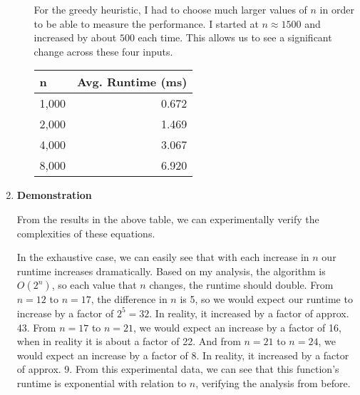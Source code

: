 \documentclass[12pt]{article}
\begin{document}
\begin{enumerate}
\begin{enumerate}
                    For the greedy heuristic, I had to choose much larger values of $n$
                    in order to be able to measure the performance. I started at $n \approx 1500$
                    and increased by about $500$ each time. This allows us to see a significant change
                    across these four inputs.
                    
                    \begin{center}
                        \begin{tabular}{ |l |r |}
                            \hline
                            \textbf{n} & \textbf{Avg. Runtime (ms)} \\
                            \hline
                            1,000      & 0.672                      \\
                            2,000      & 1.469                      \\
                            4,000      & 3.067                      \\
                            8,000      & 6.920                      \\
                            \hline
                        \end{tabular}
                    \end{center}
                    
          \end{enumerate}
          
    \item \textbf{Demonstration}
          
          From the results in the above table, we can experimentally verify
          the complexities of these equations.
          
          In the exhaustive case, we can easily see that with each increase
          in $n$ our runtime increases dramatically. Based on my analysis,
          the algorithm is $O(2^n)$, so each value that $n$ changes, the 
          runtime should double. From $n=12$ to $n=17$, the difference in $n$
          is 5, so we would expect our runtime to increase by a factor of
          $2^5 = 32$. In reality, it increased by a factor of approx. 43.
          From $n=17$ to $n=21$, we would expect an increase by a factor of 16,
          when in reality it is about a factor of 22. And from $n=21$ to $n=24$,
          we would expect an increase by a factor of 8. In reality, it increased
          by a factor of approx. 9. From this experimental data, we can see that
          this function's runtime is exponential with relation to $n$, verifying
          the analysis from before.
          

\end{enumerate}
\end{document}
